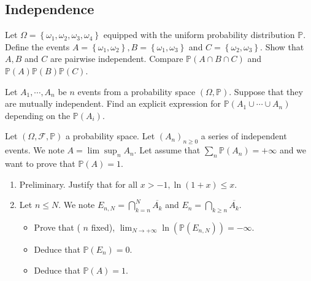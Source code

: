 \begin{center}
    \section*{Independence}
\end{center}

\begin{Exercise}
     Let $\Omega=\left\{\omega_{1}, \omega_{2}, \omega_{3}, \omega_{4}\right\}$ equipped with the uniform probability distribution $\mathbb{P}$. Define the events $A=\left\{\omega_{1}, \omega_{2}\right\}, B=\left\{\omega_{1}, \omega_{3}\right\}$ and $C=\left\{\omega_{2}, \omega_{3}\right\}$. Show that $A, B$ and $C$ are pairwise independent. Compare $\mathbb{P}(A \cap B \cap C)$ and $\mathbb{P}(A) \mathbb{P}(B) \mathbb{P}(C)$.
\end{Exercise}

\begin{Exercise}
Let $A_1, \cdots , A_n$ be $n$ events from a probability space $(\Omega, \mathbb{P})$.
Suppose that they are mutually independent. Find an explicit expression for $\mathbb{P}(A_1 \cup \cdots \cup A_n)$ depending on the $\mathbb{P}(A_i)$.
\end{Exercise}

\begin{Exercise}
  Let $(\Omega, \mathcal{F}, \mathbb{P})$ a probability space. Let $\left(A_n\right)_{n \geq 0}$ a series of independent events. We note $A=\lim \sup _n A_n$. Let assume that $\sum_n \mathbb{P}\left(A_n\right)=+\infty$ and we want to prove that $\mathbb{P}(A)=1$.
  \begin{enumerate}
    \item Preliminary. Justify that for all $x>-1, \ln (1+x) \leq x$.
    \item Let $n \leq N$. We note $E_{n, N}=\bigcap_{k=n}^N \overline{A_k}$ and $E_n=\bigcap_{k \geq n} \overline{A_k}$.
    \begin{itemize}
      \item Prove that ( $n$ fixed), $\lim _{N \rightarrow+\infty} \ln \left(\mathbb{P}\left(E_{n, N}\right)\right)=-\infty$.
      \item Deduce that $\mathbb{P}\left(E_n\right)=0$.
      \item Deduce that $\mathbb{P}(A)=1$.
    \end{itemize}
  \end{enumerate}
\end{Exercise}
